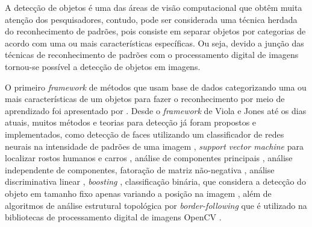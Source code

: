 
A detecção de objetos é uma das áreas de visão computacional que obtêm muita atenção dos pesquisadores, contudo, pode ser considerada uma técnica herdada do reconhecimento de padrões, pois consiste em separar objetos por categorias de acordo com uma ou mais características específicas. Ou seja, devido a junção das técnicas de reconhecimento de padrões com o processamento digital de imagens tornou-se possível a detecção de objetos em imagens\cite{Nascimento:2007}.

O primeiro {\it framework} de métodos que usam base de dados categorizando uma ou mais características de um objetos para fazer o reconhecimento por meio de aprendizado foi apresentado por . Desde o {\it framework} de Viola e Jones até os dias atuais, muitos métodos e teorias para detecção já foram propostos e implementados, como detecção de faces utilizando um classificador de redes neurais na intensidade de padrões de uma imagem \cite{Rowley:1998, Garcia:2004}, {\it support vector machine} para localizar rostos humanos e carros \cite{Osuna:1997, Papageprgiou:1999}, análise de componentes principais \cite{Jolliffe:2002}, análise independente de componentes\cite{Hyvarinen:2004}, fatoração de matriz não-negativa \cite{Lee:1999} , análise discriminativa linear \cite{Duda2012},  {\it boosting} \cite{Freund:1995}, classificação binária, que considera a detecção do objeto em tamanho fixo apenas variando a posição na imagem \cite{AmitFelzenszwalb:2014}, além de algoritmos de análise estrutural topológica por {\it border-following} \cite{Suzuki:1985} que é utilizado na bibliotecas de processamento digital de imagens OpenCV \cite{OpenCV}.



